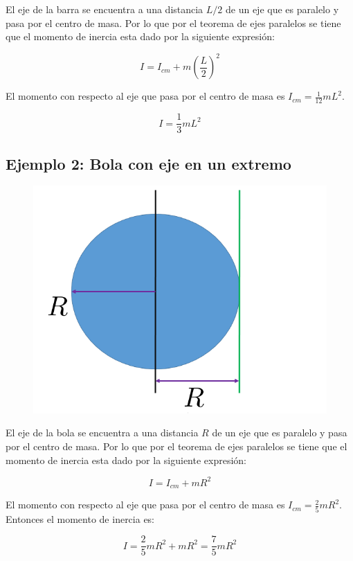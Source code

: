 \documentclass[a4paper,11pt]{article}
\begin{document}
El eje de la barra se encuentra a una distancia $L/2$ de un eje que es paralelo y pasa por el centro de masa. Por lo que por el teorema de ejes paralelos se tiene que el momento de inercia esta dado por la siguiente expresión:

$$ I = I_{cm} + m \left(\frac{L}{2}\right)^2$$

El momento con respecto al eje que pasa por el centro de masa es $I_{cm} =\frac{1}{12} m L^2$. 

$$ I = \frac{1}{3} m L^2$$

\vspace{1cm}

\subsection{Ejemplo 2: Bola con eje en un extremo}

\begin{figure}
	\includegraphics[scale=0.5]{./im/paralelobola}
\end{figure}

El eje de la bola se encuentra a una distancia $R$ de un eje que es paralelo y pasa por el centro de masa. Por lo que por el teorema de ejes paralelos se tiene que el momento de inercia esta dado por la siguiente expresión:

$$ I = I_{cm} + m R^2$$

El momento con respecto al eje que pasa por el centro de masa es $I_{cm} =\frac{2}{5} m R^2$. Entonces el momento de inercia es:

$$ I =\frac{2}{5} m R^2 + m R^2 = \frac{7}{5} m R^2$$
\end{document}
